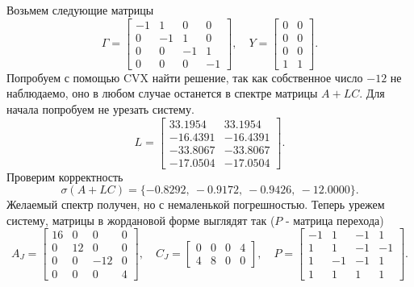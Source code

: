 Возьмем следующие матрицы
\begin{equation*}
    \Gamma=\begin{bmatrix}
        -1&  1& 0& 0\\
        0& -1& 1& 0\\
        0& 0& -1& 1\\
        0& 0& 0& -1
    \end{bmatrix},\quad
    Y=\begin{bmatrix}
        0& 0\\
    0& 0\\
    0& 0\\
    1& 1
    \end{bmatrix}.
\end{equation*}
Попробуем с помощью CVX найти решение, 
так как собственное число $-12$ не наблюдаемо,
оно в любом случае останется в спектре матрицы $A+LC$.
Для начала попробуем не урезать систему.
\begin{equation*}
    L=\begin{bmatrix}
        33.1954&	33.1954\\
        -16.4391&	-16.4391\\
        -33.8067&	-33.8067\\
        -17.0504&	-17.0504
    \end{bmatrix}.
\end{equation*}
Проверим корректность
\begin{equation*}
    \sigma(A+LC)=\{-0.8292,\ 
    -0.9172,\ 
    -0.9426,\ 
    -12.0000\}.
\end{equation*}
Желаемый спектр получен, но с немаленькой погрешностью.
Теперь урежем систему, матрицы в жордановой форме выглядят так
($P$ - матрица перехода)
\begin{equation*}
    A_J=\begin{bmatrix}
        16&     0&     0&     0\\
        0&    12&     0&     0\\
        0&     0&   -12&     0\\
        0&     0&     0&     4
    \end{bmatrix},\quad
    C_J=\begin{bmatrix}
        0&     0&     0&     4\\
        4&     8&     0&     0
    \end{bmatrix},\quad
    P=\begin{bmatrix}
        -1&     1&    -1&     1\\
        1&     1&    -1&    -1\\
        1&    -1&    -1&     1\\
        1&     1&     1&     1
    \end{bmatrix}.
\end{equation*}
